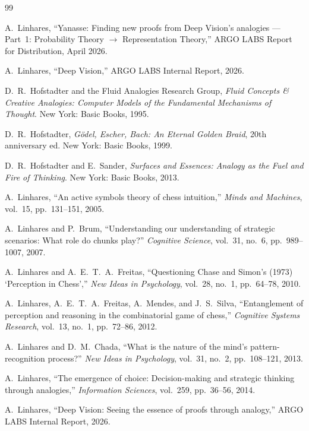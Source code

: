 \documentclass[11pt]{article}
\theoremstyle{definition}
\theoremstyle{remark}
\begin{document}
\begin{thebibliography}{99}

A.~Linhares,
``Yanasse: Finding new proofs from Deep Vision's analogies --- Part~1:
Probability Theory $\to$ Representation Theory,''
ARGO LABS Report for Distribution, April 2026.

A.~Linhares,
``Deep Vision,''
ARGO LABS Internal Report, 2026.

D.~R.~Hofstadter and the Fluid Analogies Research Group, \emph{Fluid Concepts \& Creative Analogies: Computer Models of the Fundamental Mechanisms of Thought}. New York: Basic Books, 1995.

D.~R.~Hofstadter, \emph{G\"odel, Escher, Bach: An Eternal Golden Braid}, 20th anniversary ed. New York: Basic Books, 1999.

D.~R.~Hofstadter and E.~Sander, \emph{Surfaces and Essences: Analogy as the Fuel and Fire of Thinking}. New York: Basic Books, 2013.

A.~Linhares, ``An active symbols theory of chess intuition,'' \emph{Minds and Machines}, vol.~15, pp.~131--151, 2005.

A.~Linhares and P.~Brum, ``Understanding our understanding of strategic scenarios: What role do chunks play?'' \emph{Cognitive Science}, vol.~31, no.~6, pp.~989--1007, 2007.

A.~Linhares and A.~E.~T.~A.~Freitas, ``Questioning Chase and Simon's (1973) `Perception in Chess','' \emph{New Ideas in Psychology}, vol.~28, no.~1, pp.~64--78, 2010.

A.~Linhares, A.~E.~T.~A.~Freitas, A.~Mendes, and J.~S.~Silva, ``Entanglement of perception and reasoning in the combinatorial game of chess,'' \emph{Cognitive Systems Research}, vol.~13, no.~1, pp.~72--86, 2012.

A.~Linhares and D.~M.~Chada, ``What is the nature of the mind's pattern-recognition process?'' \emph{New Ideas in Psychology}, vol.~31, no.~2, pp.~108--121, 2013.

A.~Linhares, ``The emergence of choice: Decision-making and strategic thinking through analogies,'' \emph{Information Sciences}, vol.~259, pp.~36--56, 2014.

A.~Linhares, ``Deep Vision: Seeing the essence of proofs through analogy,'' ARGO LABS Internal Report, 2026.


\end{thebibliography}
\end{document}
